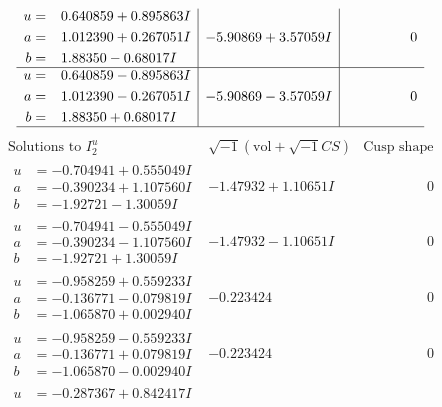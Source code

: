 \documentclass[1p]{elsarticle_modified}
\theoremstyle{definition}
\newcommand{\I}{\sqrt{-1}}
\begin{document}
$$\begin{array}{c|c|c}
\begin{aligned}
u &= \phantom{-}0.640859 + 0.895863 I \\
a &= \phantom{-}1.012390 + 0.267051 I \\
b &= \phantom{-}1.88350 - 0.68017 I\end{aligned}
 & -5.90869 + 3.57059 I & \phantom{-0.000000 } 0 \\ \hline\begin{aligned}
u &= \phantom{-}0.640859 - 0.895863 I \\
a &= \phantom{-}1.012390 - 0.267051 I \\
b &= \phantom{-}1.88350 + 0.68017 I\end{aligned}
 & -5.90869 - 3.57059 I & \phantom{-0.000000 } 0\\
 \hline 
 \end{array}$$\newpage$$\begin{array}{c|c|c}  
\text{Solutions to }I^u_{2}& \I (\text{vol} + \sqrt{-1}CS) & \text{Cusp shape}\\
 \hline 
\begin{aligned}
u &= -0.704941 + 0.555049 I \\
a &= -0.390234 + 1.107560 I \\
b &= -1.92721 - 1.30059 I\end{aligned}
 & -1.47932 + 1.10651 I & \phantom{-0.000000 } 0 \\ \hline\begin{aligned}
u &= -0.704941 - 0.555049 I \\
a &= -0.390234 - 1.107560 I \\
b &= -1.92721 + 1.30059 I\end{aligned}
 & -1.47932 - 1.10651 I & \phantom{-0.000000 } 0 \\ \hline\begin{aligned}
u &= -0.958259 + 0.559233 I \\
a &= -0.136771 - 0.079819 I \\
b &= -1.065870 + 0.002940 I\end{aligned}
 & -0.223424\phantom{ +0.000000I} & \phantom{-0.000000 } 0 \\ \hline\begin{aligned}
u &= -0.958259 - 0.559233 I \\
a &= -0.136771 + 0.079819 I \\
b &= -1.065870 - 0.002940 I\end{aligned}
 & -0.223424\phantom{ +0.000000I} & \phantom{-0.000000 } 0 \\ \hline\begin{aligned}
u &= -0.287367 + 0.842417 I \\

\end{aligned}
\end{array}$$
\end{document}
